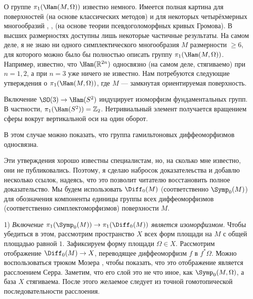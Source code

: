 О группе $\pi_1 (\Ham (M, \Omega))$ известно немного.
Имеется полная картина для поверхностей (на основе классических
методов) и для некоторых четырёхмерных многообразий \cite{G1},
\cite{A}, \cite{AM} (на основе теории псевдоголоморфных кривых
Громова). 
В высших размерностях доступны лишь некоторые частичные результаты.
На самом деле, я не знаю ни одного симплектического многообразия $M$
размерности $\ge 6$, для которого можно было бы полностью описать группу $\pi_1(\Ham (M, \Omega))$. 
Например, известно, что $\Ham (\RR^{2n})$ односвязно (на самом деле,
стягиваемо) при $n = 1, 2$, а при $n = 3$ уже ничего не известно. 
Нам потребуются следующие утверждения о $\pi_1 (\Ham (M, \Omega))$,
где $M$ — замкнутая ориентируемая поверхность. 

\begin{ex}{}\label{7.2.A}
Включение $\SO(3) \z\to \Ham(S^2)$ индуцирует изоморфизм фундаментальных групп.
В частности, $\pi_1 (\Ham (S^2))\z=\ZZ_2$.
Нетривиальный элемент получается вращением сферы вокруг вертикальной
оси на один оборот. 
\end{ex}

\begin{ex}{}
\label{7.2.B}
В этом случае можно показать, что группа гамильтоновых диффеоморфизмов
односвязна. 
\end{ex}


Эти утверждения хорошо известны специалистам, но, на сколько мне известно,
они не публиковались.
Поэтому, я сделаю набросок доказателеьства и добавлю несколько ссылок,
надеясь, что это позволит читателю восстановить полное доказательство.
Мы будем использовать $\Diff_0 (M)$ (соответственно $\Symp_0 (M)$) для
обозначения компоненты единицы группы всех диффеоморфизмов
(соответственно симплектоморфизмов) поверхности $M$. 


1) \textit{Включение $\pi_1 (\Symp_0 (M)) \to \pi_1 (\Diff_0 (M))$ является
изоморфизмом.}
Чтобы убедиться в этом, рассмотрим пространство $X$ всех форм площади
на $M$ с общей площадью равной $1$. 
Зафиксируем форму площади $\Omega \in X$.
Рассмотрим отображение $\Diff_0 (M) \to X$, переводящее диффеоморфизм
$f$ в $f^\ast \Omega$. 
Можно воспользоваться трюком Мозера \cite[p. 94--95]{MS}, чтобы
показать, что это отображение является расслоением Серра. 
Заметим, что его слой это не что иное, как $\Symp_0 (M, \Omega)$, а
база $X$ стягиваема. 
После этого желаемое следует из точной гомотопической
последовательности расслоения. 

